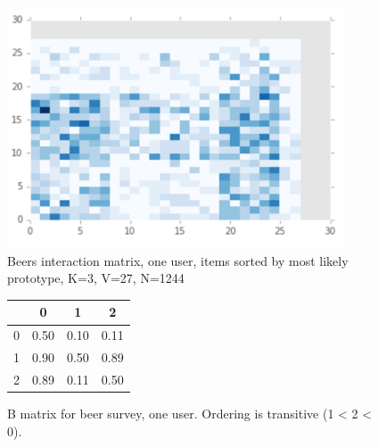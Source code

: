 \begin{figure}
\centering
\includegraphics[width=10cm]{images/interactions_beer}
\caption{Beers interaction matrix, one user, items sorted by most likely prototype, K=3, V=27, N=1244}
\label{fig:interactions_beer} 
\end{figure}

\begin{figure}
\centering
\begin{tabular}{ | c | c c c | }
\hline
& 0 & 1 & 2 \\ 
\hline
0 & 0.50 & 0.10 & 0.11 \\
1 & 0.90 & 0.50 & 0.89 \\
2 & 0.89 & 0.11 & 0.50 \\
\hline
\end{tabular}
\caption{B matrix for beer survey, one user. Ordering is transitive (1 < 2 < 0).}
\label{fig:B_beer} 
\end{figure}